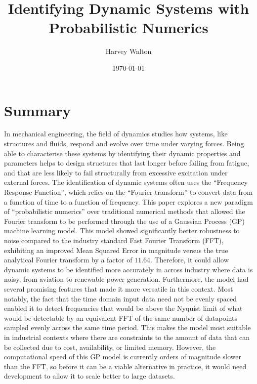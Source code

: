 \documentclass[12pt]{article}
\title{Identifying Dynamic Systems with Probabilistic Numerics}
\author{Harvey Walton}
\date{\today}
\begin{document}

    \thispagestyle{empty}
    

    \section*{Summary}
    In mechanical engineering, the field of dynamics studies how systems, like structures and fluids, respond and evolve over time under varying forces.
    Being able to characterise these systems by identifying their dynamic properties and parameters helps to design structures that last longer before failing from fatigue, and that are less likely to fail structurally from excessive excitation under external forces.
    The identification of dynamic systems often uses the ``Frequency Response Function'', which relies on the ``Fourier transform'' to convert data from a function of time to a function of frequency.
    This paper explores a new paradigm of ``probabilistic numerics'' over traditional numerical methods that allowed the Fourier transform to be performed through the use of a Gaussian Process (GP) machine learning model.
    This model showed significantly better robustness to noise compared to the industry standard Fast Fourier Transform (FFT), exhibiting an improved Mean Squared Error in magnitude versus the true analytical Fourier transform by a factor of $11.64$.
    Therefore, it could allow dynamic systems to be identified more accurately in across industry where data is noisy, from aviation to renewable power generation.
    Furthermore, the model had several promising features that made it more versatile in this context.
    Most notably, the fact that the time domain input data need not be evenly spaced enabled it to detect frequencies that would be above the Nyquist limit of what would be detectable by an equivalent FFT of the same number of datapoints sampled evenly across the same time period.
    This makes the model most suitable in industrial contexts where there are constraints to the amount of data that can be collected due to cost, availability, or limited memory.
    However, the computational speed of this GP model is currently orders of magnitude slower than the FFT, so before it can be a viable alternative in practice, it would need development to allow it to scale better to large datasets.

    \printnomenclature

    \newpage
    \tableofcontents
    \newpage
\end{document}
